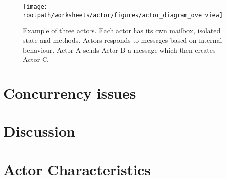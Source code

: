 \begin{figure}[ht!]
\centering
\texttt{[image: \\rootpath/worksheets/actor/figures/actor\_diagram\_overview]}
\caption{Example of three actors. Each actor has its own mailbox, isolated state and methods. Actors responds to messages based on internal behaviour. Actor A sends Actor B a message which then creates Actor C.}\label{fig:actor_overview}
\end{figure}









\section{Concurrency issues}\label{sec:actor_con_issues}

\section{Discussion}\label{sec:actor_discussion}




\section{Actor Characteristics}\label{sec:actor_charac}

\worksheetend
